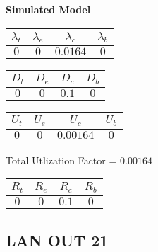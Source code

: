 \documentclass{article}
\begin{document}
\begin{minipage}{0.5\textwidth}
\centering	\textbf{Simulated Model}
\begin{table}[H]
\centering
\begin{tabular}{@{}cccc@{}}
\toprule
$\lambda_t$ & $\lambda_e$ & $\lambda_c$ & $\lambda_b$\\
\midrule
$0$ & $0$ & $0.0164$ & $0$\\
\bottomrule
\end{tabular}
\end{table}
\begin{table}[H]
\centering
\begin{tabular}{@{}cccc@{}}
\toprule
$D_t$ & $D_e$ & $D_c$ & $D_b$\\
\midrule
$0$ & $0$ & $0.1$ & $0$\\
\bottomrule
\end{tabular}
\end{table}\begin{table}[H]
\centering
\begin{tabular}{@{}cccc@{}}
\toprule
$U_t$ & $U_e$ & $U_c$ & $U_b$\\
\midrule
$0$ & $0$ & $0.00164$ & $0$\\
\bottomrule
\end{tabular}
\end{table}
\centering Total Utlization Factor = $0.00164$
\begin{table}[H]
\centering
\begin{tabular}{@{}cccc@{}}
\toprule
$R_t$ & $R_e$ & $R_c$ & $R_b$\\
\midrule
$0$ & $0$ & $0.1$ & $0$\\
\bottomrule
\end{tabular}
\end{table}
\end{minipage}\subsection{LAN OUT 21}
\end{document}
